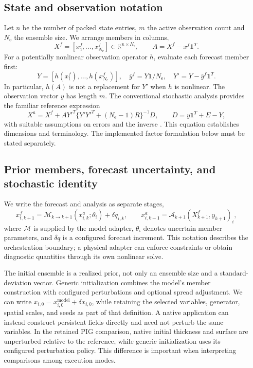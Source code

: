 \documentclass[11pt,a4paper]{article}
\newcommand{\Ne}{N_{\mathrm e}}
\begin{document}
\subsection{State and observation notation}
Let \(n\) be the number of packed state entries, \(m\) the active observation count and \(\Ne\) the ensemble size. We arrange members in columns,
\begin{equation}
 X^f=[x_1^f,\ldots,x_{\Ne}^f]\in\mathbb R^{n\times\Ne},\qquad
 A=X^f-\bar x^f\mathbf1^T.
\end{equation}
For a potentially nonlinear observation operator \(h\), evaluate each forecast member first:
\begin{equation}
 Y=[h(x_1^f),\ldots,h(x_{\Ne}^f)],\quad
 \bar y^f=Y\mathbf1/\Ne,\quad Y'=Y-\bar y^f\mathbf1^T.
\end{equation}
In particular, \(h(A)\) is not a replacement for \(Y'\) when \(h\) is nonlinear. The observation vector \(y\) has length \(m\). The conventional stochastic analysis provides the familiar reference expression
\begin{equation}
 X^a=X^f+AY'^T\{Y'Y'^T+(\Ne-1)R\}^{-1}D,
 \qquad D=y\mathbf1^T+E-Y,
 \label{eq:textbook}
\end{equation}
with suitable assumptions on errors and the inverse \citep{evensen2003,burgers1998}. This equation establishes dimensions and terminology. The implemented factor formulation below must be stated separately.

\subsection{Prior members, forecast uncertainty, and stochastic identity}
We write the forecast and analysis as separate stages,
\begin{equation}
 x_{i,k+1}^{f}=\mathcal M_{k\rightarrow k+1}(x_{i,k}^{a};\theta_i)
       +\delta q_{i,k},\qquad
 x_{i,k+1}^{a}=\mathcal A_{k+1}(X_{k+1}^{f},y_{k+1})_i,
 \label{eq:forecastcycle}
\end{equation}
where \(\mathcal M\) is supplied by the model adapter, \(\theta_i\) denotes uncertain member parameters, and \(\delta q\) is a configured forecast increment. This notation describes the orchestration boundary; a physical adapter can enforce constraints or obtain diagnostic quantities through its own nonlinear solve.

The initial ensemble is a realized prior, not only an ensemble size and a standard-deviation vector. Generic initialization combines the model's member construction with configured perturbations and optional spread adjustment. We can write \(x_{i,0}=x_{i,0}^{\mathrm{model}}+\delta x_{i,0}\), while retaining the selected variables, generator, spatial scales, and seeds as part of that definition. A native application can instead construct persistent fields directly and need not perturb the same variables. In the retained PIG comparison, native initial thickness and surface are unperturbed relative to the reference, while generic initialization uses its configured perturbation policy. This difference is important when interpreting comparisons among execution modes.
\end{document}
